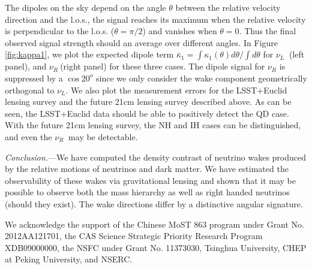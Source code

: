 \documentclass[aps,prl,twocolumn,showpacs,superscriptaddress,groupedaddress,nofootinbib]{revtex4}  %
\newcommand{\nur}{\ensuremath{{\nu_R~}}}
\newcommand{\nul}{\ensuremath{{\nu_L~}}}
\begin{document}
The dipoles on the sky depend on the angle $\theta$ between the relative
velocity direction and the l.o.s., the signal reaches its maximum when 
the relative velocity is perpendicular to the l.o.s. ($\theta=\pi/2$) and 
vanishes when $\theta=0$.
Thus the final observed signal strength should 
an average over different angles.
In Figure \ref{fig:kappa1}, we plot the expected 
dipole term $\bar{\kappa}_1=\int\kappa_1(\theta)d\theta/\int d\theta$ for  \nul 
(left panel),  and \nur (right panel) for these three cases.
The dipole signal for $\nu_R$ is suppressed by a $\cos 20^o$ since we
only consider the wake component geometrically orthogonal to $\nu_L$.
We also plot the measurement errors for the
LSST+Euclid lensing survey and the future 21cm lensing survey described
above.  As can be seen, the LSST+Euclid data should be able to positively
detect the QD case. With the future 21cm lensing survey, the
NH and IH cases can be distinguished, and even the \nur 
may be detectable.





{\it Conclusion.}---We have computed the density contrast of neutrino
wakes produced by the relative motions of neutrinos and dark matter.
We have estimated the observability of these wakes via gravitational
lensing and shown that it may be possible to observe both the mass
hierarchy as well as right handed neutrinos (should they exist).  The
wake directions
differ by a distinctive angular signature.

 
We acknowledge the support of the Chinese MoST 863 program under Grant 
No. 2012AA121701, the CAS Science Strategic Priority Research Program 
XDB09000000, the NSFC under Grant No. 11373030, Tsinghua University, 
CHEP at Peking University, and NSERC.



\end{document}
